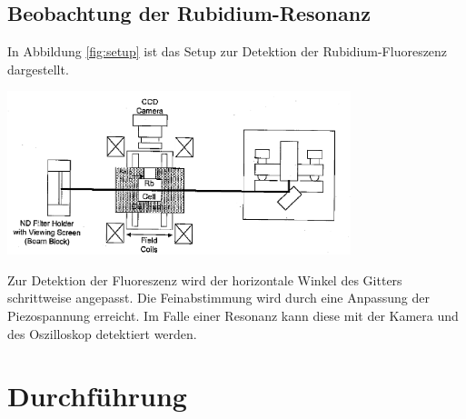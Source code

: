 \documentclass[captions=tableheading]{scrartcl}
\let\oldsection\section
\renewcommand\section{\clearpage\oldsection}
\begin{document}
\subsection{Beobachtung der Rubidium-Resonanz}
In Abbildung \ref{fig:setup} ist das Setup zur Detektion der Rubidium-Fluoreszenz dargestellt.
\begin{center}
	\includegraphics[width=10cm]{images/setup.png}
	\label{fig:setup}
\end{center}
Zur Detektion der Fluoreszenz wird der horizontale Winkel des Gitters schrittweise angepasst. Die Feinabstimmung wird durch eine Anpassung der Piezospannung erreicht. Im Falle einer Resonanz kann diese mit der Kamera und des Oszilloskop detektiert werden. \\

\section{Durchführung}
\end{document}
